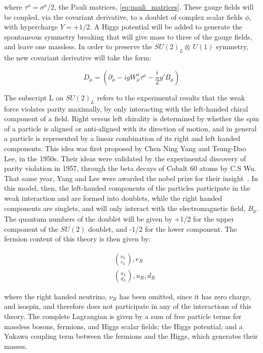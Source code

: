 \noindent where $\tau^{a} = \sigma^{a}/2$, the Pauli matrices,
\ref{eq:pauli_matrices}.  These gauge fields will be coupled, via the
covariant derivative, to a doublet of complex scalar fields $\phi$,
with hypercharge $Y=+1/2$.  A Higgs potential will be added to 
generate the spontaneous symmetry breaking that will give mass to
three of the gauge fields, and leave one massless.  In order to
preserve the $SU(2)_{L}\otimes~U(1)$ symmetry, the new covariant 
derivative will take the form:

\begin{equation}\label{eq:ewk_covariant_derivative}
D_{\mu} = (\partial_{\mu} - igW_{\mu}^{a}\tau^{a} -
\frac{i}{2}g'B_{\mu})
\end{equation}

\par The subscript L on $SU(2)_{L}$ refers to the experimental
results that the weak force violates parity maximally, by only
interacting with the left-handed chiral component of a field.  Right
versus left chirality is determined by whether the spin of a particle
is aligned or anti-aligned with its direction of motion, and in
general a particle is represented by a linear combination of its right and
left handed components.  This idea was first proposed by Chen Ning
Yang and Tsung-Dao Lee, in the 1950s.  Their ideas were validated by
the experimental discovery of parity violation in 1957, through the beta decays of Cobalt
60 atoms by C.S Wu.  That same year, Yang and Lee were awarded the
nobel prize for their insight~\cite{th:YangLee_NobelPrize}.  In this
model, then, the left-handed components of the particles participate
in the weak interaction and are formed into doublets, while the right handed
components are singlets, and will only interact with the
electromagnetic field, $B_{\mu}$.  The quantum numbers of the doublet
will be given by +1/2 for the upper component of the $SU(2)$ doublet,
and -1/2 for the lower component.  The fermion content of this theory
is then given by:

\begin{equation}\label{eq:ewk_fermion_doublets}
\begin{aligned}
&\binom{\nu_{L}}{e_{L}}, e_{R} \\
&\binom{u_{L}}{d_{L}}, u_{R}, d_{R} 
\end{aligned}
\end{equation}

\noindent where the right handed neutrino, $\nu_{R}$ has been omitted,
since it has zero charge, and isospin, and therefore does not
participate in any of the interactions of this theory.  The complete
Lagrangian is given by a sum of free particle terms for  massless bosons,
fermions, and Higgs scalar fields; the Higgs potential; and a Yukawa
coupling term between the fermions and the Higgs, which generates
their masses. 

